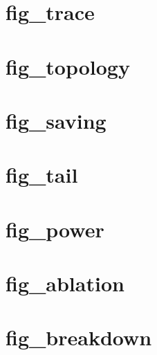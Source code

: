 \documentclass[a4paper]{article}
\begin{document}
\section*{fig\_trace}

\clearpage
\section*{fig\_topology}

\clearpage
\section*{fig\_saving}

\clearpage
\section*{fig\_tail}

\clearpage
\section*{fig\_power}

\clearpage
\section*{fig\_ablation}

\clearpage
\section*{fig\_breakdown}

\clearpage
\end{document}
